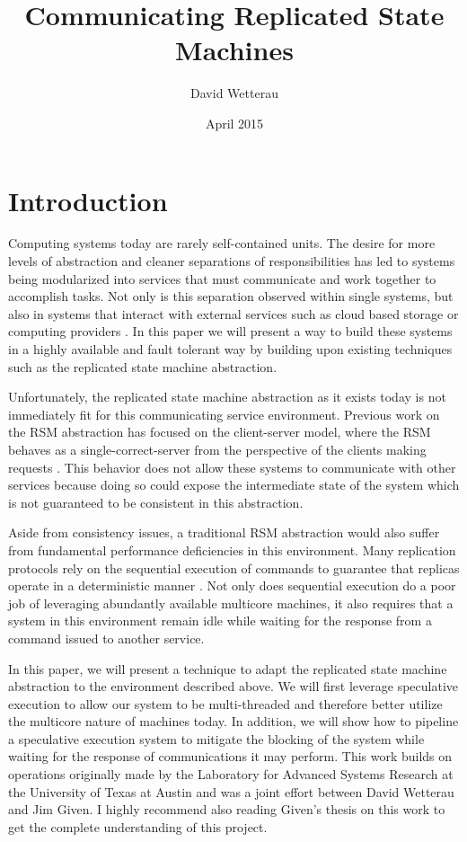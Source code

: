 \documentclass[11pt, oneside]{report}
\title{Communicating Replicated State Machines}
\author{David Wetterau}
\date{April 2015}
\begin{document}
\maketitle

\tableofcontents

\chapter{Introduction}\label{Introduction}
Computing systems today are rarely self-contained units. 
The desire for more levels of abstraction and cleaner separations of responsibilities has led to systems being modularized into services that must communicate and work together to accomplish tasks. 
Not only is this separation observed within single systems, but also in systems that interact with external services such as cloud based storage or computing providers \cite{spanner, tao, dynamo}. 
In this paper we will present a way to build these systems in a highly available and fault tolerant way by building upon existing techniques such as the replicated state machine abstraction.

Unfortunately, the replicated state machine abstraction as it exists today is not immediately fit for this communicating service environment. 
Previous work on the RSM abstraction has focused on the client-server model, where the RSM behaves as a single-correct-server from the perspective of the clients making requests \cite{schneider}. 
This behavior does not allow these systems to communicate with other services because doing so could expose the intermediate state of the system which is not guaranteed to be consistent in this abstraction.

Aside from consistency issues, a traditional RSM abstraction would also suffer from fundamental performance deficiencies in this environment. 
Many replication protocols rely on the sequential execution of commands to guarantee that replicas operate in a deterministic manner \cite{practicalBFT, upRight, hq, paxos}. 
Not only does sequential execution do a poor job of leveraging abundantly available multicore machines, it also requires that a system in this environment remain idle while waiting for the response from a command issued to another service.

In this paper, we will present a technique to adapt the replicated state machine abstraction to the environment described above. 
We will first leverage speculative execution \cite{eve, zyz} to allow our system to be multi-threaded and therefore better utilize the multicore nature of machines today. 
In addition, we will show how to pipeline a speculative execution system to mitigate the blocking of the system while waiting for the response of communications it may perform. 
This work builds on operations originally made by the Laboratory for Advanced Systems Research at the University of Texas at Austin and was a joint effort between David Wetterau and Jim Given. 
I highly recommend also reading Given’s thesis on this work to get the complete understanding of this project.
\end{document}
